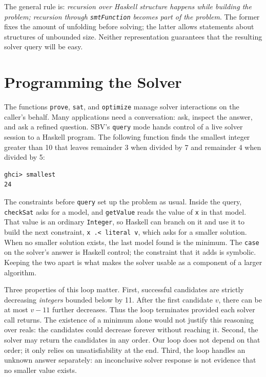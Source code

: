 \documentclass[acmsmall,screen,review,anonymous,nonacm]{acmart}
\newcommand{\code}[1]{\texttt{#1}}
\begin{document}
The general rule is: \emph{recursion over Haskell structure happens while building
the problem; recursion through \code{smtFunction} becomes part of the problem}.
The former fixes the amount of unfolding before solving; the latter allows
statements about structures of unbounded size. Neither representation guarantees
that the resulting solver query will be easy.

\section{Programming the Solver}
\label{sec:queries}

The functions \code{prove}, \code{sat}, and \code{optimize} manage solver
interactions on the caller's behalf. Many applications need a conversation: ask, inspect the
answer, and ask a refined question. SBV's \code{query} mode hands control of a
live solver session to a Haskell program. The following function finds the
smallest integer greater than 10 that leaves remainder 3 when divided by 7 and
remainder 4 when divided by 5:
\begin{lstlisting}[style=output]
ghci> smallest
24
\end{lstlisting}
The constraints before \code{query} set up the problem as usual. Inside the
query, \code{checkSat} asks for a model, and \code{getValue} reads the value of
\code{x} in that model. That value is an ordinary \code{Integer}, so Haskell can
branch on it and use it to build the next constraint, \code{x .< literal v},
which asks for a smaller solution. When no smaller solution exists, the last
model found is the minimum. The \code{case} on the solver's answer is Haskell
control; the constraint that it adds is symbolic. Keeping the two apart is what
makes the solver usable as a component of a larger algorithm.

Three properties of this loop matter. First, successful candidates are strictly
decreasing \emph{integers} bounded below by 11. After the first candidate $v$,
there can be at most $v-11$ further decreases. Thus the loop terminates provided
each solver call returns. The existence of a minimum alone would not justify
this reasoning over reals: the candidates could decrease forever without
reaching it. Second, the solver may return the candidates in any order. Our loop
does not depend on that order; it only relies on unsatisfiability at the end.
Third, the loop handles an unknown answer separately: an inconclusive solver
response is not evidence that no smaller value exists.
\end{document}
